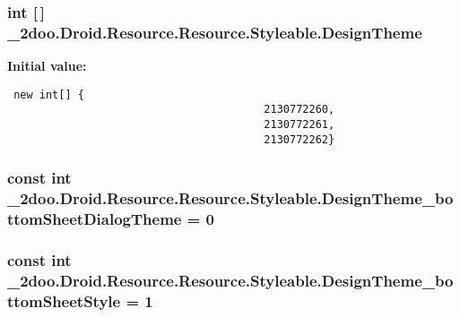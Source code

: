\hypertarget{class__2doo_1_1_droid_1_1_resource_1_1_styleable_b385e4c20b94cc5bfe8c8f009543c06d}{
\subsubsection[{DesignTheme}]{\setlength{\rightskip}{0pt plus 5cm}int \mbox{[}$\,$\mbox{]} \_\-2doo.Droid.Resource.Resource.Styleable.DesignTheme}}
\label{class__2doo_1_1_droid_1_1_resource_1_1_styleable_b385e4c20b94cc5bfe8c8f009543c06d}


\textbf{Initial value:}

\begin{Code}\begin{verbatim} new int[] {
                                        2130772260,
                                        2130772261,
                                        2130772262}
\end{verbatim}
\end{Code}
\hypertarget{class__2doo_1_1_droid_1_1_resource_1_1_styleable_45ee134c24a4d33e74d3348af2984533}{
\subsubsection[{DesignTheme\_\-bottomSheetDialogTheme}]{\setlength{\rightskip}{0pt plus 5cm}const int \_\-2doo.Droid.Resource.Resource.Styleable.DesignTheme\_\-bottomSheetDialogTheme = 0}}
\label{class__2doo_1_1_droid_1_1_resource_1_1_styleable_45ee134c24a4d33e74d3348af2984533}


\hypertarget{class__2doo_1_1_droid_1_1_resource_1_1_styleable_2609181fa880372ea5f631aef702b115}{
\subsubsection[{DesignTheme\_\-bottomSheetStyle}]{\setlength{\rightskip}{0pt plus 5cm}const int \_\-2doo.Droid.Resource.Resource.Styleable.DesignTheme\_\-bottomSheetStyle = 1}}
\label{class__2doo_1_1_droid_1_1_resource_1_1_styleable_2609181fa880372ea5f631aef702b115}


